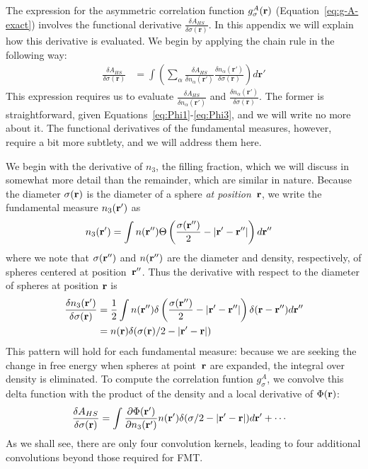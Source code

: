 The expression for the asymmetric correlation function
$g_\sigma^A(\textbf{r})$ (Equation~\ref{eq:g-A-exact}) involves the
functional derivative $\frac{\delta A_{HS}}{\delta
  \sigma(\mathbf{r})}$.  In this appendix we will explain how this
derivative is evaluated.  We begin by applying the chain rule in the
following way:
  \begin{align}
    \frac{\delta A_{HS}}{\delta \sigma(\mathbf{r})} &=
    \int \left(
    \sum_\alpha
    \frac{\delta A_{HS}}{\delta n_\alpha(\mathbf{r}')}
    \frac{\delta n_\alpha(\mathbf{r}')}{\delta \sigma(\mathbf{r})}
    \right) d\mathbf{r}'
  \end{align}
This expression requires us to evaluate $\frac{\delta A_{HS}}{\delta
  n_\alpha(\mathbf{r}')}$ and $\frac{\delta
  n_\alpha(\mathbf{r}')}{\delta \sigma(\mathbf{r})}$.  The former is
straightforward, given Equations~\ref{eq:Phi1}-\ref{eq:Phi3}, and we
will write no more about it.  The functional derivatives of the
fundamental measures, however, require a bit more subtlety, and we
will address them here.

We begin with the derivative of $n_3$, the filling fraction, which we
will discuss in somewhat more detail than the remainder, which are
similar in nature.  Because the diameter $\sigma(\textbf{r})$ is the diameter
of a sphere \emph{at position~$\textbf{r}$}, we write the fundamental measure
$n_3(\textbf{r}')$ as
\begin{align}
  n_3(\textbf{r}') &= \int n(\textbf{r}'') \Theta\left(\frac{\sigma(\textbf{r}'')}{2}
  -\left|\textbf{r}' - \textbf{r}''\right|\right)
  d\textbf{r}''
\end{align}
where we note that $\sigma(\textbf{r}'')$ and $n(\textbf{r}'')$ are the diameter and
density, respectively, of spheres centered at position~$\textbf{r}''$.  Thus the
derivative with respect to the diameter of spheres at position
$\textbf{r}$ is
\begin{align}
  \frac{\delta n_3(\textbf{r}')}{\delta \sigma(\textbf{r})} &= \frac 12 \int n
  (\textbf{r}'') \delta\left(\frac{\sigma(\textbf{r}'')}{2} -\left|\textbf{r}' - \textbf{r}''\right|\right)
  \delta(\textbf{r}-\textbf{r}'') d\textbf{r}'' \\ &= n (\textbf{r}) \delta(\sigma(\textbf{r})/2
  -\left|\textbf{r}' - \textbf{r}\right|)
\end{align}
This pattern will hold for each fundamental measure: because we are
seeking the change in free energy when spheres at point~$\textbf{r}$ are
expanded, the integral over density is eliminated.  To compute the
correlation funtion $g_\sigma^A$, we convolve this delta function with
the product of the density and a local derivative of $\Phi(\textbf{r})$:
\begin{align}
  \frac{\delta A_{HS}}{\delta \sigma(\textbf{r})} &= \int \frac{\partial \Phi(\textbf{r}')}{\partial
    n_3(\textbf{r}')}n(\textbf{r}') \delta(\sigma/2-|\textbf{r}'-\textbf{r}|)d\textbf{r}'
  + \cdots
\end{align}
As we shall see, there are only four convolution kernels, leading to
four additional convolutions beyond those required for FMT.

